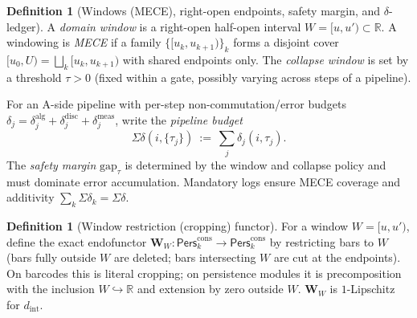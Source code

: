 \documentclass[11pt]{article}
\numberwithin{equation}{section}
\theoremstyle{plain}
\theoremstyle{definition}
\theoremstyle{remark}
\newcommand{\Pers}{\mathsf{Pers}}
\theoremstyle{plain}
\theoremstyle{definition}
\numberwithin{equation}{section}
\theoremstyle{definition}
\newtheorem{definition}[theorem]{Definition}
\numberwithin{equation}{section}
\theoremstyle{plain}
\theoremstyle{definition}
\theoremstyle{remark}
\newcommand{\bbR}{\mathbb{R}}
\newcommand{\Perscons}{\Pers^{\mathrm{cons}}_k}
\newcommand{\Crop}{\mathbf{W}}
\newcommand{\intdist}{d_{\mathrm{int}}}
\providecommand{\intdist}{d_{\mathrm{int}}}  %
\begin{document}
\begin{definition}[Windows (MECE), right-open endpoints, safety margin, and \(\delta\)-ledger]\label{def:windows-delta}
A \emph{domain window} is a right-open half-open interval \(W=[u,u')\subset\bbR\). A windowing is \emph{MECE} if a family \(\{[u_k,u_{k+1})\}_k\) forms a disjoint cover \([u_0,U)=\bigsqcup_k [u_k,u_{k+1})\) with shared endpoints only. The \emph{collapse window} is set by a threshold \(\tau>0\) (fixed within a gate, possibly varying across steps of a pipeline).

For an A-side pipeline with per-step non-commutation/error budgets \(\delta_j=\delta^{\mathrm{alg}}_j+\delta^{\mathrm{disc}}_j+\delta^{\mathrm{meas}}_j\), write the \emph{pipeline budget}
\[
\Sigma\delta(i,\{\tau_j\})\ :=\ \sum_j \delta_j(i,\tau_j).
\]
The \emph{safety margin} \(\mathrm{gap}_\tau\) is determined by the window and collapse policy and must dominate error accumulation. Mandatory logs ensure MECE coverage and additivity \(\sum_k \Sigma\delta_k=\Sigma\delta\).
\end{definition}

\begin{definition}[Window restriction (cropping) functor]\label{def:cropping}
For a window \(W=[u,u')\), define the exact endofunctor \(\Crop_{W}:\Perscons\to \Perscons\) by restricting bars to \(W\) (bars fully outside \(W\) are deleted; bars intersecting \(W\) are cut at the endpoints). On barcodes this is literal cropping; on persistence modules it is precomposition with the inclusion \(W\hookrightarrow\bbR\) and extension by zero outside \(W\). \(\Crop_{W}\) is \(1\)-Lipschitz for \(\intdist\).
\end{definition}
\end{document}
